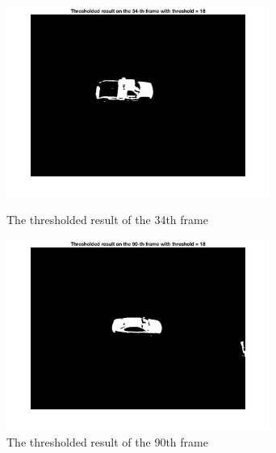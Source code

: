 \documentclass[a4paper]{article}
\begin{document}
\begin{spacing}{2.0}
\begin{enumerate}
	\begin{figure}[H]
	    \begin{minipage}[t]{0.5\textwidth}
	        \centering
	        \includegraphics[width=3.4in]{2_5.jpg}
	        \caption{The thresholded result of the 34th frame}
	        \label{fig:side:a}
	    \end{minipage}%
	  \begin{minipage}[t]{0.5\textwidth}
	      \centering
	      \includegraphics[width=3.4in]{2_6.jpg}
	      \caption{The thresholded result of the 90th frame}
	      \label{fig:side:b}
	    \end{minipage}
	\end{figure}
	

\end{enumerate}
\end{spacing}
\end{document}
